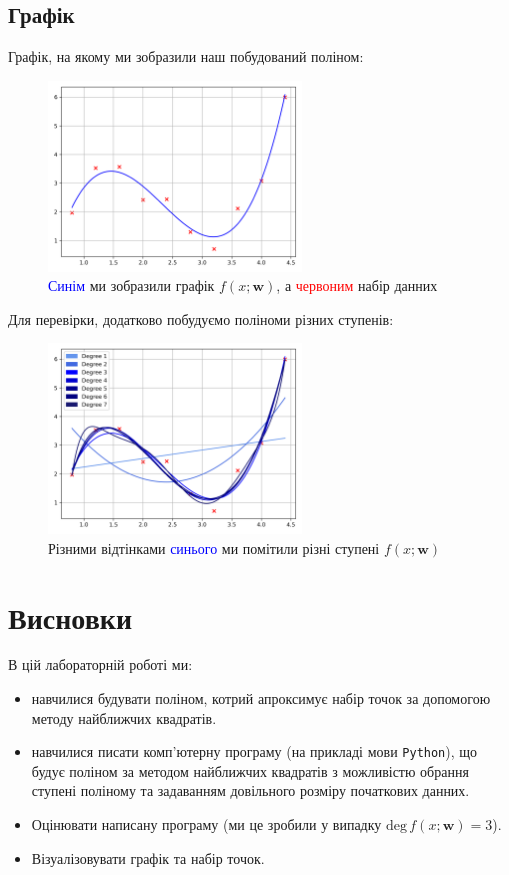 \documentclass[12pt]{extarticle}
\begin{document}
\subsection{Графік}
Графік, на якому ми зобразили наш побудований поліном:
\begin{figure}[H]
    \centering
    \includegraphics[width=0.6\textwidth]{images/lab_3/plot.png}
    \caption{\textcolor{blue}{Синім} ми зобразили графік $f(x;\mathbf{w})$, а \textcolor{red}{червоним} набір данних}
    \label{fig:3}
\end{figure}
Для перевірки, додатково побудуємо поліноми різних ступенів:
\begin{figure}[H]
    \centering
    \includegraphics[width=0.6\textwidth]{images/lab_3/degrees.png}
    \caption{Різними відтінками \textcolor{blue}{синього} ми помітили різні ступені $f(x;\mathbf{w})$}
    \label{fig:3}
\end{figure}

\pagebreak
\section{Висновки}

В цій лабораторній роботі ми:
\begin{itemize}
\item навчилися будувати поліном, котрий апроксимує набір точок за допомогою методу найближчих квадратів.
\item навчилися писати комп'ютерну програму (на прикладі мови \texttt{Python}), що будує поліном за методом найближчих квадратів з можливістю обрання ступені поліному та задаванням довільного розміру початкових данних.
\item Оцінювати написану програму (ми це зробили у випадку $\text{deg} \, f(x;\mathbf{w}) = 3$).
\item Візуалізовувати графік та набір точок.
\end{itemize}
\end{document}
